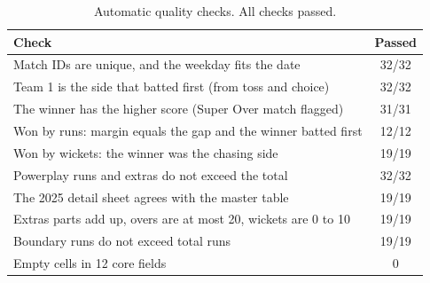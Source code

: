 \begin{table}[!t]
\caption{Automatic quality checks. All checks passed.}
\label{tab:checks}
\centering
\footnotesize
\renewcommand{\arraystretch}{1.05}
\begin{tabular}{@{}p{}c@{}}
\toprule
\textbf{Check} & \textbf{Passed} \\
\midrule
Match IDs are unique, and the weekday fits the date & 32/32 \\
Team 1 is the side that batted first (from toss and choice) & 32/32 \\
The winner has the higher score (Super Over match flagged) & 31/31 \\
Won by runs: margin equals the gap and the winner batted first & 12/12 \\
Won by wickets: the winner was the chasing side & 19/19 \\
Powerplay runs and extras do not exceed the total & 32/32 \\
The 2025 detail sheet agrees with the master table & 19/19 \\
Extras parts add up, overs are at most 20, wickets are 0 to 10 & 19/19 \\
Boundary runs do not exceed total runs & 19/19 \\
Empty cells in 12 core fields & 0 \\
\bottomrule
\end{tabular}
\end{table}
